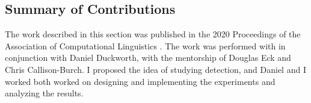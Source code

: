 % 


\subsection{Summary of Contributions}
The work described in this section was published in the 2020 Proceedings of the Association of Computational Linguistics \citep{ippolito2020automatic}.
The work was performed with in conjunction with Daniel Duckworth, with the mentorship of Douglas Eck and Chris Callison-Burch.
I proposed the idea of studying detection, and Daniel and I worked both worked on designing and implementing the experiments and analyzing the results.


